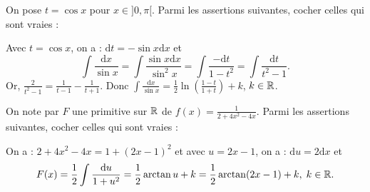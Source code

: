 \begin{question}
On pose $t=\cos x$ pour $x\in ]0,\pi[$. Parmi les assertions suivantes, cocher celles qui sont vraies :
\begin{answers}  
\end{answers}
\vskip2mm
\begin{explanations}
Avec $t=\cos x$, on a : $\mathrm{d}t=-\sin x\mathrm{d}x$ et 
$$\int \frac{\mathrm{d}x}{\sin x}=\int \frac{\sin x\mathrm{d}x}{\sin ^2x}=\int \frac{-\mathrm{d}t}{1-t^2}=\int \frac{\mathrm{d}t}{t^2-1}.$$
Or, $\displaystyle \frac{2}{t^2-1}=\frac{1}{t-1}-\frac{1}{t+1}$. Donc
$\displaystyle \int \frac{\mathrm{d}x}{\sin x}=\frac{1}{2}\ln \left(\frac{1-t}{1+t}\right)+k$, $k\in \mathbb{R}$.
\end{explanations}
\end{question}


\begin{question}
On note par $F$ une primitive sur $\mathbb{R}$ de $\displaystyle f(x)=\frac{1}{2+4x^2-4x}$. Parmi les assertions suivantes, cocher celles qui sont vraies :
\begin{answers} 
\end{answers}
\begin{explanations}
On a : $2+4x^2-4x=1+(2x-1)^2$ et avec $u=2x-1$, on a : $\mathrm{d}u=2\mathrm{d}x$ et 
$$F(x)=\frac{1}{2}\int \frac{\mathrm{d}u}{1+u^2}=\frac{1}{2}\arctan u+k=\frac{1}{2}\arctan (2x-1)+k,\; k\in \mathbb{R}.$$
\end{explanations}
\end{question}  

